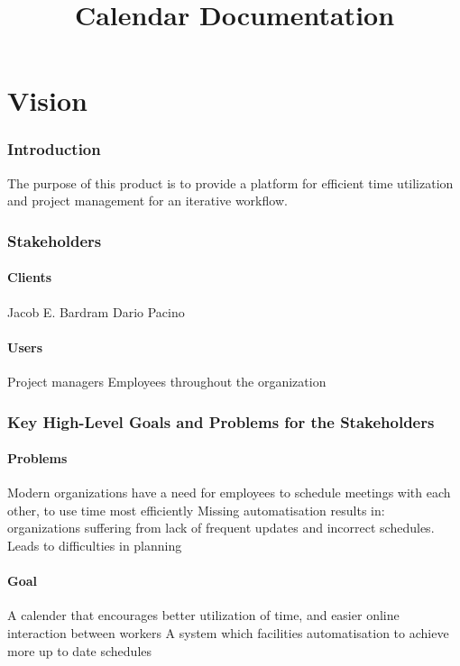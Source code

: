 \documentclass[10pt]{article}
\title{Calendar Documentation}
\begin{document}
\tableofcontents

\part{Vision}

\section{Introduction}
The purpose of this product is to provide a platform for efficient time utilization and project management for an iterative workflow.

\section{Stakeholders}
\subsection{Clients}
Jacob E. Bardram
Dario Pacino 

\subsection{Users}
Project managers
Employees throughout the organization

\section{Key High-Level Goals and Problems for the Stakeholders}

\subsection{Problems}
Modern organizations have a need for employees to schedule meetings with each other, to use time most efficiently
Missing automatisation results in: organizations suffering from lack of frequent updates and incorrect schedules. Leads to difficulties in planning

\subsection{Goal}
A calender that encourages better utilization of time, and easier online interaction between workers
A system which facilities automatisation to achieve more up to date schedules
\end{document}
